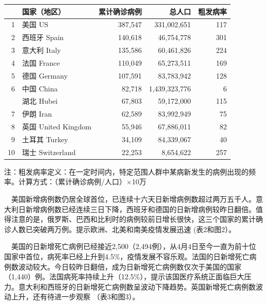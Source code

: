 \documentclass[
]{article}
\begin{document}
\begin{table}[H]
    \caption{累计确诊前十位国家}
      \vspace{-0.5\baselineskip}
      \centering \begin{table}[H]
\centering\begingroup\fontsize{18}{20}\selectfont

\begin{tabular}{rlrrr}
\toprule
  & 国家（地区） & 累计确诊病例 & 总人口 & 粗发病率\\
\midrule
\rowcolor{gray!6}  1 & 美国 US & 387,547 & 331,002,651 & 117\\
2 & 西班牙 Spain & 140,618 & 46,754,778 & 301\\
\rowcolor{gray!6}  3 & 意大利 Italy & 135,586 & 60,461,826 & 224\\
4 & 法国 France & 110,049 & 65,273,511 & 169\\
\rowcolor{gray!6}  5 & 德国 Germany & 107,591 & 83,783,942 & 128\\
6 & 中国 China & 82,718 & 1,439,323,776 & 6\\
\rowcolor{gray!6}   & 湖北 Hubei & 67,803 & 59,172,000 & 115\\
7 & 伊朗 Iran & 62,589 & 83,992,949 & 75\\
\rowcolor{gray!6}  8 & 英国 United Kingdom & 55,946 & 67,886,011 & 82\\
9 & 土耳其 Turkey & 34,109 & 84,339,067 & 40\\
\rowcolor{gray!6}  10 & 瑞士 Switzerland & 22,253 & 8,654,622 & 257\\
\bottomrule
\end{tabular}
\endgroup{}
\end{table} \begin{tablenotes}
        \fontsize{15}{15}
        \selectfont
        \item 注：粗发病率定义：在一定时间内，特定范围人群中某病新发生的病例出现的频率。计算方式：（累计确诊病例/人口）×10万  %
      \end{tablenotes}
    \end{table}

\(\quad\)美国新增病例数仍居全球首位，已连续十六天日新增病例数超过两万五千人。意大利日新增病例数已经连续三日下降，西班牙和德国的日新增病例较昨日翻倍。值得注意的是，俄罗斯、巴西和比利时的病例较前日增长很快，这三个国家的累计确诊人数已突破两万例。提示欧洲、北美和南美疫情发展迅速
(表2和图2）。

\(\quad\)美国的日新增死亡病例已经接近2,500（2,494例），从4月4日至今一直为前十位国家中首位，病死率已经上升到4.5\%，疫情发展不容乐观。法国的日新增死亡病例数波动较大。今日较昨日翻倍，成为日新增死亡病例数仅次于美国的国家（1,440）例。法国病死率持续上升（12.5\%），提示该国医疗系统正面临巨大压力。意大利和西班牙的日新增死亡病例数呈波动下降趋势。英国新增死亡病例数波动上升，还有待进一步观察
（表3和图3）。
\end{document}
